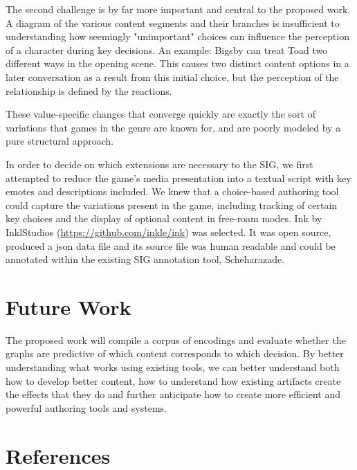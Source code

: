 \documentclass[10pt]{article}
\begin{document}
The second challenge is by far more important and central to the
proposed work. A diagram of the various content segments and their
branches is insufficient to understanding how seemingly "unimportant"
choices can influence the perception of a character during key
decisions. An example: Bigsby can treat Toad two different ways in the
opening scene. This causes two distinct content options in a later
conversation as a result from this initial choice, but the perception
of the relationship is defined by the reactions.

These value-specific changes that converge quickly are exactly the
sort of variations that games in the genre are known for, and are
poorly modeled by a pure structural approach.

In order to decide on which extensions are necessary to the SIG, we
first attempted to reduce the game's media presentation into a textual
script with key emotes and descriptions included. We knew that a
choice-based authoring tool could capture the variations present in
the game, including tracking of certain key choices and the display of
optional content in free-roam modes. Ink by InklStudios
(\url{https://github.com/inkle/ink}) was selected. It was open source,
produced a json data file and its source file was human readable and
could be annotated within the existing SIG annotation tool,
Scheharazade.

\section{Future Work}
\label{sec:orgheadline5}
The proposed work will compile a corpus of encodings and evaluate
whether the graphs are predictive of which content corresponds to
which decision. By better understanding what works using existing
tools, we can better understand both how to develop better content,
how to understand how existing artifacts create the effects that they
do and further anticipate how to create more efficient and powerful
authoring tools and systems.

\section{References}
\label{sec:orgheadline6}


\end{document}
